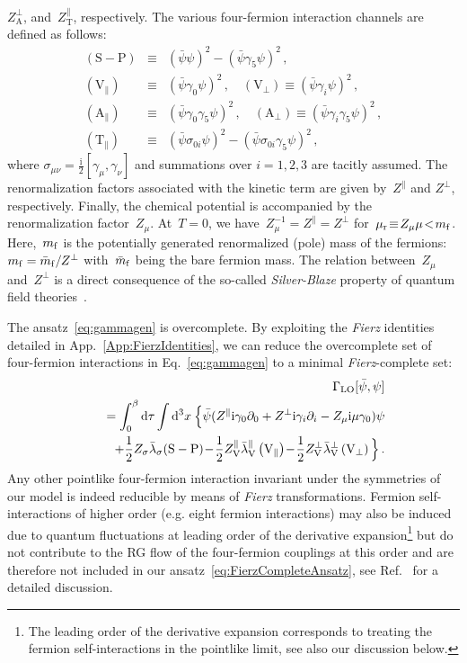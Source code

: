 \documentclass[prd,english,preprintnumbers,amsmath,amssymb,nofootinbib,twocolumn,superscriptaddress]{revtex4-1}
\newcommand{\I}{\mathrm{i}}
\newcommand{\be}{\begin{eqnarray}}
\newcommand{\ee}{\end{eqnarray}}
\newcommand{\del}{\partial}
\newcommand{\nn}{\nonumber }
\newcommand{\psib}{\bar{\psi}}
\begin{document}
{$Z_{\text{A}}^{\perp}$, and~$Z_{\text{T}}^{\parallel}$, respectively. The various four-fermion interaction channels
are defined as follows:
%
\be
(\text{S}-\text{P}) &\equiv& (\psib \psi) ^2 - (\psib \gamma_5 \psi)^2\,,\nn\\
 \left(\text{V}_{\parallel}\right) &\equiv& (\psib \gamma_0 \psi)^2\,,\quad
\left(\text{V}_{\perp}\right) \equiv ( \psib \gamma_i \psi)^2\,,\nn\\
 \left(\text{A}_{\parallel}\right) &\equiv& (\psib \gamma_0 \gamma_5 \psi)^2\,,\quad
 \left(\text{A}_{\perp}\right)\equiv ( \psib \gamma_i \gamma_5 \psi)^2\,,\nn\\
 \left(\text{T}_{\parallel}\right) &\equiv& (\psib \sigma_{0 i} \psi)^2 - (\psib \sigma_{0 i} \gamma_5 \psi)^2\,,
\ee
%
where $\sigma_{\mu\nu}=\frac{\I}{2}[\gamma_{\mu},\gamma_{\nu}]$ and 
summations over $i=1,2,3$ are tacitly assumed.
The renormalization factors associated with the kinetic term are given by~$Z^\parallel$ and $Z^\perp$, respectively. Finally, the 
chemical potential is accompanied by the renormalization factor~$Z_{\mu}$. At~$T=0$, we 
have~$Z_{\mu}^{-1}\!=\!Z^{\parallel}\!=\!Z^{\perp}$ for~$\mu_{\rm r}\!\equiv\! Z_{\mu}\mu\! <\! m_{\rm f}$. Here,~$m_{\rm f}$ is the 
potentially 
generated renormalized (pole) mass of the fermions:~$m_{\rm f}=\bar{m}_{\rm f}/Z^{\perp}$ with~$\bar{m}_{\rm f}$ being 
the bare fermion mass. The relation between~$Z_{\mu}$ and~$Z^{\perp}$ 
is a direct consequence of the so-called {\it Silver-Blaze} property of quantum field theories~\cite{Cohen:2003kd}.

The ansatz~\eqref{eq:gammagen} is overcomplete. By exploiting the {\it Fierz} identities detailed
in App.~\ref{App:FierzIdentities}, we can reduce the overcomplete set of four-fermion interactions 
in Eq.~\eqref{eq:gammagen} to a minimal {\it Fierz}-complete set:%
%
\be
&& \Gamma_{\rm LO}[\psib, \psi] \nn\\
&& \quad = \int_0 ^\beta {\rm d} \tau  \int {\rm d}^3 x \: \Big\{ 
\psib ( Z^\parallel \I \gamma_0 \del_0 + Z^\perp \I \gamma_i \del_i - Z_\mu\I  \mu \gamma_0 ) \psi\nn \\
&&\quad +\frac{1}{2} Z_{\sigma}\bar\lambda_\sigma (\text{S}-\text{P}) \!-\! \frac{1}{2}Z_{\text{V}}^{\parallel}\bar \lambda ^\parallel _\text V \left( \text{V}_{\parallel} \right)
\!-\!\frac{1}{2} Z_{\text{V}}^{\perp}\bar \lambda ^\perp _\text V \left( \text{V}_{\perp} \right)\Big\}\,.
\label{eq:FierzCompleteAnsatz}
\ee
%
Any other pointlike four-fermion interaction invariant under the symmetries of our model
is indeed reducible by means of {\it Fierz} transformations. Fermion self-interactions of higher order (e.g. eight fermion interactions) 
may also be induced due to quantum fluctuations 
at leading order of the derivative expansion\footnote{The leading order of the derivative expansion corresponds
to treating the fermion self-interactions in the pointlike limit, see also our discussion below.}
but do not contribute to the RG flow of the four-fermion couplings at this order and are therefore not included in 
our ansatz~\eqref{eq:FierzCompleteAnsatz}, see Ref.~\cite{Braun:2011pp} for a detailed discussion.

}
\end{document}
